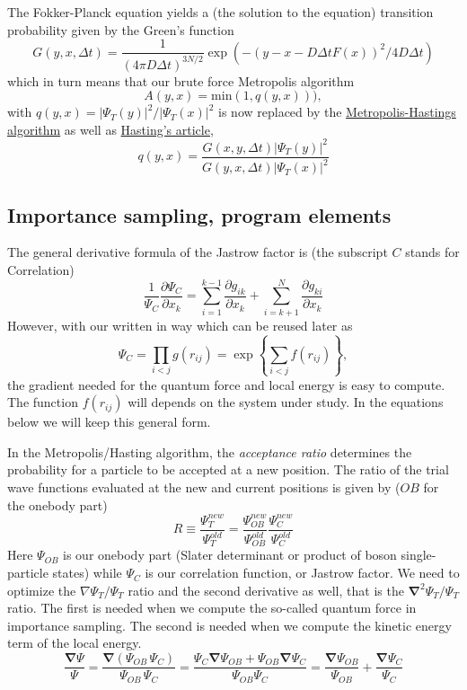 \documentclass[%
oneside,                 %
final,                   %
10pt]{article}
\begin{document}
The Fokker-Planck equation yields a (the solution to the equation) transition probability given by the Green's function
\[
  G(y,x,\Delta t) = \frac{1}{(4\pi D\Delta t)^{3N/2}} \exp{\left(-(y-x-D\Delta t F(x))^2/4D\Delta t\right)}
\]
which in turn means that our brute force Metropolis algorithm
\[ 
    A(y,x) = \mathrm{min}(1,q(y,x))),
\]
with $q(y,x) = |\Psi_T(y)|^2/|\Psi_T(x)|^2$ is now replaced by the \href{{http://scitation.aip.org/content/aip/journal/jcp/21/6/10.1063/1.1699114}}{Metropolis-Hastings algorithm} as well as \href{{http://biomet.oxfordjournals.org/content/57/1/97.abstract}}{Hasting's article}, 
\[
q(y,x) = \frac{G(x,y,\Delta t)|\Psi_T(y)|^2}{G(y,x,\Delta t)|\Psi_T(x)|^2}
\]

\subsection*{Importance sampling, program elements}

The general derivative formula of the Jastrow factor is (the subscript $C$ stands for Correlation)
\[
\frac{1}{\Psi_C}\frac{\partial \Psi_C}{\partial x_k} =
\sum_{i=1}^{k-1}\frac{\partial g_{ik}}{\partial x_k}
+
\sum_{i=k+1}^{N}\frac{\partial g_{ki}}{\partial x_k}
\]
However, 
with our written in way which can be reused later as
\[
\Psi_C=\prod_{i< j}g(r_{ij})= \exp{\left\{\sum_{i<j}f(r_{ij})\right\}},
\]
the gradient needed for the quantum force and local energy is easy to compute.  
The function $f(r_{ij})$ will depends on the system under study. In the equations below we will keep this general form.

In the Metropolis/Hasting algorithm, the \emph{acceptance ratio} determines the probability for a particle  to be accepted at a new position. The ratio of the trial wave functions evaluated at the new and current positions is given by ($OB$ for the onebody  part)
\[
R \equiv \frac{\Psi_{T}^{new}}{\Psi_{T}^{old}} = 
\frac{\Psi_{OB}^{new}}{\Psi_{OB}^{old}}\frac{\Psi_{C}^{new}}{\Psi_{C}^{old}}
\]
Here $\Psi_{OB}$ is our onebody part (Slater determinant or product of boson single-particle states)  while $\Psi_{C}$ is our correlation function, or Jastrow factor. 
We need to optimize the $\nabla \Psi_T / \Psi_T$ ratio and the second derivative as well, that is
the $\mathbf{\nabla}^2 \Psi_T/\Psi_T$ ratio. The first is needed when we compute the so-called quantum force in importance sampling.
The second is needed when we compute the kinetic energy term of the local energy.
\[
\frac{\mathbf{\mathbf{\nabla}}  \Psi}{\Psi}  = \frac{\mathbf{\nabla}  (\Psi_{OB} \, \Psi_{C})}{\Psi_{OB} \, \Psi_{C}}  =  \frac{ \Psi_C \mathbf{\nabla}  \Psi_{OB} + \Psi_{OB} \mathbf{\nabla}  \Psi_{C}}{\Psi_{OB} \Psi_{C}} = \frac{\mathbf{\nabla}  \Psi_{OB}}{\Psi_{OB}} + \frac{\mathbf{\nabla}   \Psi_C}{ \Psi_C}
\]
\end{document}
